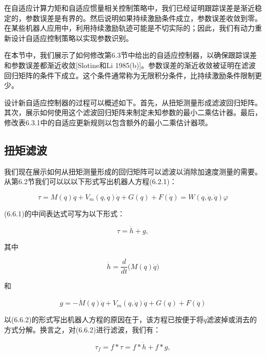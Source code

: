 \documentclass[12pt,a4paper]{ctexart}
\begin{document}
在自适应计算力矩和自适应惯量相关控制策略中，我们已经证明跟踪误差是渐近稳定的，参数误差是有界的。然后说明如果持续激励条件成立，参数误差收敛到零。在某些机器人应用中，利用持续激励轨迹可能是不切实际的；因此，我们有动力重新设计自适应控制策略以实现参数识别。

在本节中，我们展示了如何修改第6.3节中给出的自适应控制器，以确保跟踪误差和参数误差都渐近收敛[Slotine和Li 1985(b)]。参数误差的渐近收敛被证明在滤波回归矩阵的条件下成立。这个条件通常称为无限积分条件，比持续激励条件限制更少。

设计新自适应控制器的过程可以概述如下。首先，从扭矩测量形成滤波回归矩阵。其次，展示如何使用这个滤波回归矩阵来制定未知参数的最小二乘估计器。最后，修改表6.3.1中的自适应更新规则以包含额外的最小二乘估计器项。

\subsection*{扭矩滤波}

我们现在展示如何从扭矩测量形成的回归矩阵可以滤波以消除加速度测量的需要。从第6.2节我们可以以以下形式写出机器人方程(6.2.1)：

\begin{equation}\label{eq:6.6.1}
\tau = M(q)\ddot{q} + V_m(q, \dot{q})\dot{q} + G(q) + F(\dot{q}) = W(q, \dot{q}, \ddot{q})\varphi
\end{equation}

(6.6.1)的中间表达式可写为以下形式：

\begin{equation}\label{eq:6.6.2}
\tau = \dot{h} + g,
\end{equation}

其中

\begin{equation}\label{eq:6.6.3}
\dot{h} = \frac{d}{dt}\bigl(M(q)\dot{q}\bigr)
\end{equation}

和

\begin{equation}\label{eq:6.6.4}
g = -\dot{M}(q)\dot{q} + V_m(q, \dot{q})\dot{q} + G(q) + F(\dot{q})
\end{equation}

以(6.6.2)的形式写出机器人方程的原因在于，该方程已按便于将$\ddot{q}$滤波掉或消去的方式分解。换言之，对(6.6.2)进行滤波，我们有：

\begin{equation}\label{eq:6.6.5}
\tau_f = f * \tau = f * \dot{h} + f * g,
\end{equation}
\end{document}
